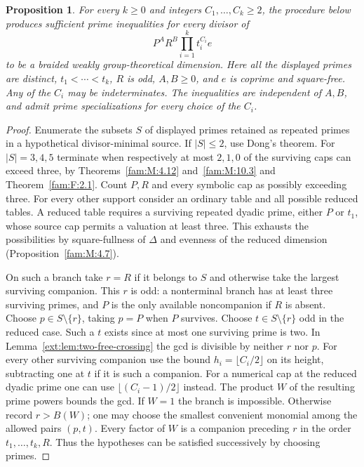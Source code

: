 \documentclass[11pt,a4paper]{article}
\numberwithin{equation}{section}
\newtheorem{proposition}[theorem]{Proposition}
\theoremstyle{remark}
\begin{document}
\begin{proposition}\label{ext:prop:crossing-certificates}
For every $k\ge0$ and integers $C_1,\ldots,C_k\ge2$, the procedure
below produces sufficient prime inequalities for every divisor of
\[
             P^A R^B\prod_{i=1}^k t_i^{C_i} e
\]
to be a braided weakly group-theoretical dimension. Here all the
displayed primes are distinct, $t_1<\cdots<t_k$, $R$ is odd,
$A,B\ge0$, and $e$ is coprime and square-free. Any of the
$C_i$ may be indeterminates. The inequalities are independent of
$A,B$, and admit prime specializations for every choice of the
$C_i$.
\end{proposition}
\begin{proof}
Enumerate the subsets $S$ of displayed primes retained as repeated
primes in a hypothetical divisor-minimal source. If $|S|\le2$, use
Dong's theorem. For $|S|=3,4,5$ terminate when respectively at
most $2,1,0$ of the surviving caps can exceed three, by
Theorems~\ref{fam:M:4.12} and~\ref{fam:M:10.3} and Theorem~\ref{fam:F:2.1}.
Count $P,R$ and every symbolic cap as possibly exceeding three.
For every other support consider an ordinary table and all possible
reduced tables. A reduced table requires a surviving repeated
dyadic prime, either $P$ or $t_1$, whose source cap permits a
valuation at least three. This exhausts the possibilities by
square-fullness of $\Delta$ and evenness of the reduced dimension
(Proposition~\ref{fam:M:4.7}).

On such a branch take $r=R$ if it belongs to $S$ and otherwise
take the largest surviving companion. This $r$ is odd: a
nonterminal branch has at least three surviving primes, and $P$
is the only available noncompanion if $R$ is absent. Choose
$p\in S\setminus\{r\}$, taking $p=P$ when $P$ survives. Choose
$t\in S\setminus\{r\}$ odd in the reduced case. Such a $t$
exists since at most one surviving prime is two. In
Lemma~\ref{ext:lem:two-free-crossing} the gcd is divisible by neither
$r$ nor $p$. For every other surviving companion use the bound
$h_i=\lfloor C_i/2\rfloor$ on its height, subtracting one at $t$
if it is such a companion. For a numerical cap at the reduced
dyadic prime one can use $\lfloor(C_i-1)/2\rfloor$ instead.
The product $W$ of the resulting prime powers bounds the gcd.
If $W=1$ the branch is impossible. Otherwise record $r>B(W)$; one may choose the
smallest convenient monomial among the allowed pairs $(p,t)$.
Every factor of $W$ is a companion preceding $r$ in the order
$t_1,\ldots,t_k,R$. Thus the hypotheses can be satisfied
successively by choosing primes.


\end{proof}
\end{document}

